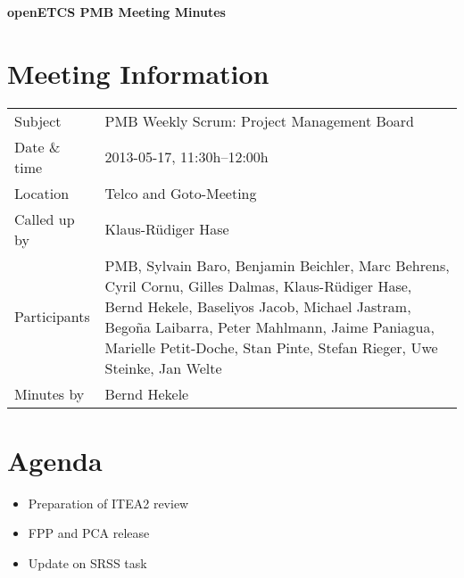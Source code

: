 \documentclass[a4paper, 11pt]{article}
\begin{document}
{\begin{center}\huge\bf openETCS PMB Meeting Minutes\end{center}}
\section{Meeting Information}

\renewcommand{\arraystretch}{1.5}
\begin{supertabular}{m{.2\textwidth}m{.8\textwidth}}
Subject & PMB Weekly Scrum: Project Management Board\\
Date \& time & 2013-05-17, 11:30h--12:00h\\
Location & Telco and Goto-Meeting\\
Called up by & Klaus-R\"udiger Hase\\
Participants & PMB,
Sylvain Baro,
Benjamin Beichler,
Marc Behrens,
Cyril Cornu, 
Gilles Dalmas,
Klaus-R\"udiger Hase,
Bernd Hekele,
Baseliyos Jacob,
Michael Jastram, 
Bego\~na Laibarra,
Peter Mahlmann, 
Jaime Paniagua,
Marielle Petit-Doche, 
Stan Pinte,
Stefan Rieger,
Uwe Steinke,
Jan Welte
\\

Minutes by & Bernd Hekele\\

\end{supertabular}
\renewcommand{\arraystretch}{1.0}


\section{{Agenda}}
\begin{itemize}
\item Preparation of ITEA2 review
\item FPP and PCA release
\item Update on SRSS task
\end{itemize}
\end{document}
